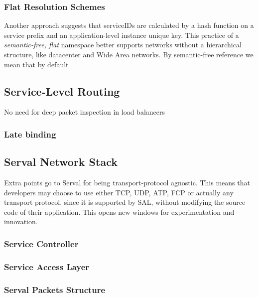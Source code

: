 \subsubsection{Flat Resolution Schemes}
Another approach suggests that serviceIDs are calculated by a hash function on a service prefix and an application-level instance unique key.
This practice of a \emph{semantic-free, flat} namespace better supports networks without a hierarchical structure, like datacenter and Wide Area networks.
By semantic-free\cite{Walfisha2004} reference we mean that by default 


\subsection{Service-Level Routing} 
No need for deep packet inspection in load balancers



\subsubsection{Late binding}
\subsection{Serval Network Stack}
Extra points go to Serval for being transport-protocol agnostic.
This means that developers may choose to use either TCP, UDP, ATP, FCP or actually any transport protocol, since it is supported by SAL, without modifying the source code of their application.
This opens new windows for experimentation and innovation.
\subsubsection{Service Controller}
\subsubsection{Service Access Layer}
\subsubsection{Serval Packets Structure}




